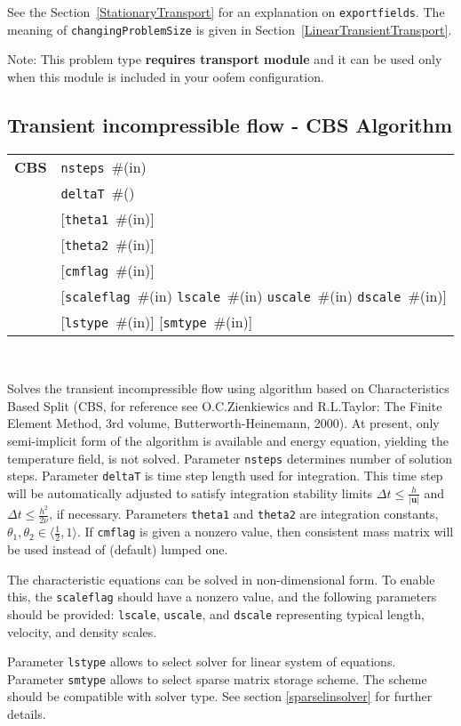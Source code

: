 \documentclass[a4paper]{article}
\newcommand{\mbf}[1]{\boldsymbol{#1}}
\newcommand{\param}[1]{\texttt{#1}} %
\newcommand{\optional}[1]{[#1]} %
\newcommand{\field}[2]{\param{#1}~\#{\tiny(#2)}} %
\newcommand{\optField}[2]{\optional{\field{#1}{#2}}}
\newcommand{\entKeywordInst}[1]{\textbf{#1}} %
\newenvironment{record}[1][]{\begin{tabular}{|ll}}{\end{tabular}\\}
\newcommand{\recentry}[2]{{#1}&{#2}\\}
\newcounter{rcc}
\newenvironment{record}[1][\textwidth]{\setcounter{rcc}{0}\rowcolors{1}{lightgray}{lightgray}\tabularx{#1}{llR} \hline}
               {\endtabularx}
\newcommand{\recentry}[2]{\ifthenelse{\value{rcc}>0}{$\backslash$ \\}{\setcounter{rcc}{1}}{#1}&{#2}&}
\begin{document}
See the Section~\ref{StationaryTransport} for an explanation on
\param{exportfields}. The meaning 
of \param{changingProblemSize} is given in Section~\ref{LinearTransientTransport}.

Note: This problem type \textbf{requires transport module} and it
can be used only when this module is included in your oofem
configuration.

\subsection{Transient incompressible flow - CBS Algorithm}
\label{cbsIncomp}
\begin{record}
  \recentry{\entKeywordInst{CBS}}{\field{nsteps}{in}}
  \recentry{}{\field{deltaT}{}}
  \recentry{}{\optField{theta1}{in}}
  \recentry{}{\optField{theta2}{in}}
  \recentry{}{\optField{cmflag}{in}}
  \recentry{}{[\field{scaleflag}{in} \field{lscale}{in} \field{uscale}{in} \field{dscale}{in}]}
  \recentry{}{\optField{lstype}{in} \optField{smtype}{in}}
\end{record}

Solves the transient incompressible flow using algorithm based on
Characteristics Based Split (CBS, for reference see O.C.Zienkiewics
and R.L.Taylor: The Finite Element Method, 3rd volume,
Butterworth-Heinemann, 2000). At present, only semi-implicit form
of the algorithm is available and energy equation, yielding the
temperature field, is not solved.
Parameter \param{nsteps} determines number of solution
steps. Parameter \param{deltaT} is time step length used for
integration. This time step will be automatically adjusted to satisfy
integration stability limits $\Delta t \le {\frac{h}{\vert\mbf{u}\vert}}$ and $\Delta t \le {\frac{h^2}{2\nu}}$, if necessary.
Parameters \param{theta1} and \param{theta2} are integration constants, $\theta_1, \theta_2 \in \langle{\frac12}, 1\rangle$.
If \param{cmflag} is given a nonzero value, then
consistent mass matrix will be used instead of (default) lumped one.

The characteristic equations can be solved in non-dimensional form. To
enable this, the \param{scaleflag} should have a nonzero value,
and the following parameters should be provided: \param{lscale},
\param{uscale}, and \param{dscale} representing typical length,
velocity, and density scales.

Parameter \param{lstype} allows to select solver for linear system of
equations. Parameter \param{smtype} allows to select sparse matrix storage
scheme. The scheme should be compatible with solver type. See section
\ref{sparselinsolver} for further details.
\end{document}
